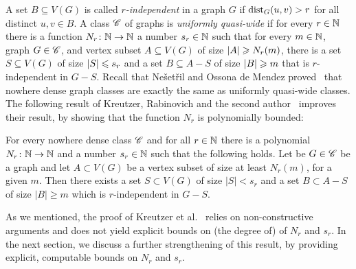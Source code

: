  

A set $B\subseteq V(G)$ is called {\em{$r$-independent}} in a graph
$G$ if $\mathrm{dist}_G(u,v)>r$ for all distinct $u,v\in B$.  A class $\mathscr{C}$
of graphs is \emph{uniformly quasi-wide} if for every $r\in \mathbb{N}$ there
is a function $N_r\colon\mathbb{N}\to\mathbb{N}$ a number $s_r\in \mathbb{N}$ such that for
every $m\in \mathbb{N}$, graph $G\in \mathscr{C}$, and vertex subset
$A\subseteq V(G)$ of size $\left\lvert A\right\rvert\geqslant N_r(m)$, there is a set
$S\subseteq V(G)$ of size $\left\lvert S\right\rvert\leqslant s_r$ and a set $B\subseteq A-S$
of size $\left\lvert B\right\rvert\geqslant m$ that is $r$-independent in $G-S$.  Recall that
Ne\v set\v ril and Ossona de Mendez
proved~\cite{nevsetvril2011nowhere} that nowhere dense graph classes
are exactly the same as uniformly quasi-wide classes.  The following
result of Kreutzer, Rabinovich and the second
author~\cite{siebertz2016polynomial} improves their result, by showing
that the function $N_r$ is polynomially bounded:


\begin{theorem}\label{thm:krs}
  For every nowhere dense class $\mathscr{C}$ and for all $r\in \mathbb{N}$ there is
  a polynomial $N_r\colon \mathbb{N}\to\mathbb{N}$ and a number $s_r\in \mathbb{N}$ such that
  the following holds.  Let be $G\in \mathscr{C}$ be a graph and let
  $A\subset V(G)$ be a vertex subset of size at least $N_r(m)$, for a
  given $m$.  Then there exists a set $S\subset V(G)$ of size
  $|S|<s_r$ and a set $B\subset A-S$ of size $|B|\ge m$ which is
  $r$-independent in $G-S$.
\end{theorem}

As we mentioned, the proof of Kreutzer et
al.~\cite{siebertz2016polynomial} relies on non-constructive arguments
and does not yield explicit bounds on (the degree of) of $N_r$ and
$s_r$.  In the next section, we discuss a further strengthening of
this result, by providing explicit, computable bounds on $N_r$ and
$s_r$.
